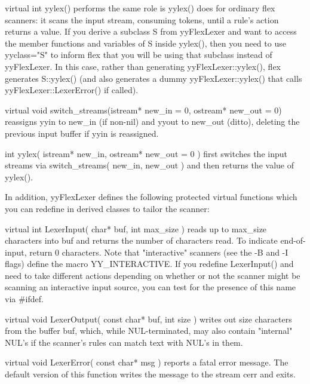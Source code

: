 \documentclass[12pt,spanish,twocolumn,lettersize]{article}
\begin{document}
{       virtual int yylex()
	      performs the same role is yylex() does for ordinary
	      flex scanners: it scans the input stream, consuming
	      tokens,  until a rule's action returns a value.  If
	      you derive a subclass S from yyFlexLexer	and  want
	      to  access  the member functions and variables of S
	      inside  yylex(),	then  you  need	 to  use  %
	      yyclass="S"  to  inform flex that you will be using
	      that subclass  instead  of  yyFlexLexer.	 In  this
	      case,  rather than generating yyFlexLexer::yylex(),
	      flex generates S::yylex()	 (and  also  generates	a
	      dummy	 yyFlexLexer::yylex()	   that	    calls
	      yyFlexLexer::LexerError() if called).

       virtual void switch_streams(istream* new_in = 0,
	      ostream* new_out = 0) reassigns yyin to new_in  (if
	      non-nil) and yyout to new_out (ditto), deleting the
	      previous input buffer if yyin is reassigned.

       int yylex( istream* new_in, ostream* new_out = 0 )
	      first    switches	   the	  input	   streams    via
	      switch_streams(  new_in, new_out ) and then returns
	      the value of yylex().

       In addition, yyFlexLexer defines the  following	protected
       virtual	functions  which  you  can  redefine  in  derived
       classes to tailor the scanner:

       virtual int LexerInput( char* buf, int max_size )
	      reads  up	 to  max_size  characters  into	 buf  and
	      returns the number of characters read.  To indicate
	      end-of-input,  return  0	characters.   Note   that
	      "interactive"  scanners  (see  the -B and -I flags)
	      define the macro YY_INTERACTIVE.	If  you	 redefine
	      LexerInput()  and	 need  to  take different actions
	      depending on whether or not the  scanner	might  be
	      scanning	an interactive input source, you can test
	      for the presence of this name via #ifdef.

       virtual void LexerOutput( const char* buf, int size )
	      writes out size characters  from	the  buffer  buf,
	      which,   while  NUL-terminated,  may  also  contain
	      "internal" NUL's if the scanner's rules  can  match
	      text with NUL's in them.

       virtual void LexerError( const char* msg )
	      reports a fatal error message.  The default version
	      of this function writes the message to  the  stream
	      cerr and exits.

}
\end{document}
